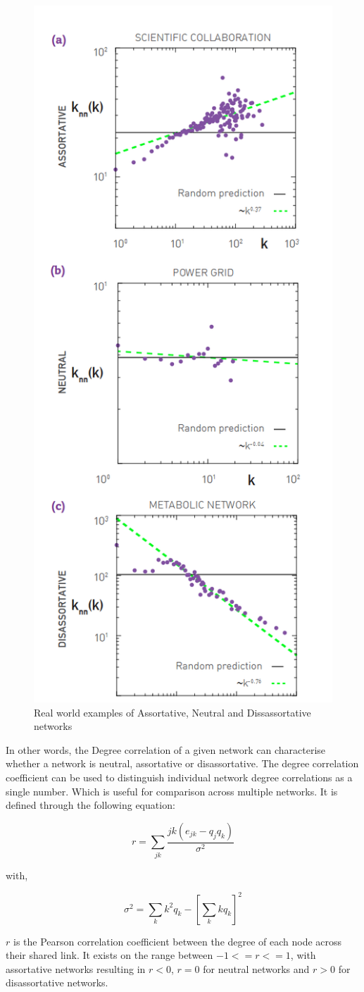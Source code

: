 \begin{figure}
    \centering
    \includegraphics[width=0.3\linewidth]{images/Degree_Correlation_Examples.png}
    \caption{Real world examples of Assortative, Neutral and Dissassortative networks \cite{barabasi2016network}}
    \label{fig:Example_Degree_Corr}
\end{figure}

In other words, the Degree correlation of a given network can characterise whether a network is neutral, assortative or disassortative. The degree correlation coefficient \cite{Assortive_Mixing} can be used to distinguish individual network degree correlations as a single number. Which is useful for comparison across multiple networks. It is defined through the following equation:

\begin{equation}
    r= \sum_{jk}\frac{jk(e_{jk}-q_jq_k)}{\sigma^2}
\end{equation}

with,

\begin{equation}
    \sigma^2 = \sum_{k}k^2q_k-\left[\sum_{k}kq_k\right]^2
\end{equation}

$r$ is the Pearson correlation coefficient between the degree of each node across their shared link. \cite{barabasi2016network} It exists on the range between $-1 <=r<=1$, with assortative networks resulting in $r<0$, $r=0$ for neutral networks and $r>0$ for disassortative networks. 



